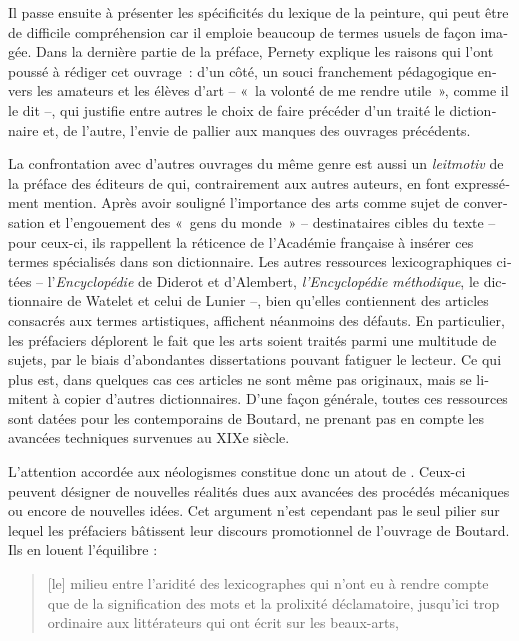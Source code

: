\documentclass[output=paper,colorlinks,citecolor=brown,arabicfont,chinesefont,booklanguage=french]{langscibook}
\begin{document}
\begin{otherlanguage}{french}
Il passe ensuite à présenter les spécificités du lexique de la peinture, qui peut être de difficile compréhension car il emploie beaucoup de termes usuels de façon imagée. Dans la dernière partie de la préface, Pernety explique les raisons qui l’ont poussé à rédiger cet ouvrage~: d’un côté, un souci franchement pédagogique envers les amateurs et les élèves d’art – «~la volonté de me rendre utile~», comme il le dit –, qui justifie entre autres le choix de faire précéder d’un traité le dictionnaire et, de l’autre, l’envie de pallier aux manques des ouvrages précédents. 

La confrontation avec d’autres ouvrages du même genre est aussi un \emph{leitmotiv} de la préface des éditeurs de \citealt{Boutard1826} qui, contrairement aux autres auteurs, en font expressément mention. Après avoir souligné l’importance des arts comme sujet de conversation et l’engouement des «~gens du monde~» – destinataires cibles du texte – pour ceux-ci, ils rappellent la réticence de l’Académie française à insérer ces termes spécialisés dans son dictionnaire. Les autres ressources lexicographiques citées – l’\emph{Encyclopédie} de Diderot et d’Alembert, \emph{l’Encyclopédie méthodique}, le dictionnaire de Watelet et celui de Lunier –, bien qu’elles contiennent des articles consacrés aux termes artistiques, affichent néanmoins des défauts. En particulier, les préfaciers déplorent le fait que les arts soient traités parmi une multitude de sujets, par le biais d’abondantes dissertations pouvant fatiguer le lecteur. Ce qui plus est, dans quelques cas ces articles ne sont même pas originaux, mais se limitent à copier d’autres dictionnaires. D’une façon générale, toutes ces ressources sont datées pour les contemporains de Boutard, ne prenant pas en compte les avancées techniques survenues au XIXe siècle.

L’attention accordée aux néologismes constitue donc un atout de \citet{Boutard1826}. Ceux-ci peuvent désigner de nouvelles réalités dues aux avancées des procédés mécaniques ou encore de nouvelles idées. Cet argument n’est cependant pas le seul pilier sur lequel les préfaciers bâtissent leur discours promotionnel de l’ouvrage de Boutard. Ils en louent l’équilibre :

\begin{quote}
    [le] milieu entre l’aridité des lexicographes qui n’ont eu à rendre compte que de la signification des mots et la prolixité déclamatoire, jusqu’ici trop ordinaire aux littérateurs qui ont écrit sur les beaux-arts, 
\end{quote}


\end{otherlanguage}
\end{document}
